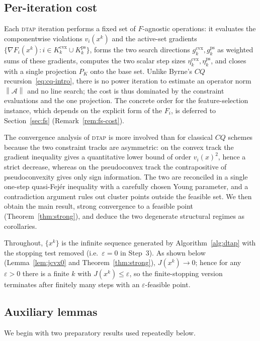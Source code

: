 \documentclass[]{interact}
\theoremstyle{plain}
\theoremstyle{definition}
\theoremstyle{remark}
\newcommand{\norm}[1]{\left\lVert #1 \right\rVert}
\newcommand{\cvx}{\mathrm{cvx}}
\newcommand{\ps}{\mathrm{ps}}
\newcommand{\dtap}{\textsc{dtap}}
\begin{document}
\subsection{Per-iteration cost}\label{ssec:complexity}
Each \dtap{} iteration performs a fixed set of $F$-agnostic operations: it evaluates the
componentwise violations $v_i(x^k)$ and the active-set gradients $\{\nabla F_i(x^k):i\in
K^{\cvx}_k\cup K^{\ps}_k\}$, forms the two search directions $g^{\cvx}_k,g^{\ps}_k$ as weighted
sums of these gradients, computes the two scalar step sizes $\eta^{\cvx}_k,\eta^{\ps}_k$, and
closes with a single projection $P_K$ onto the base set. Unlike Byrne's $CQ$
recursion~\eqref{eq:cq-intro}, there is no power iteration to estimate an operator norm
$\norm{\mathcal{A}}$ and no line search; the cost is thus dominated by the constraint
evaluations and the one projection. The concrete order for the feature-selection instance,
which depends on the explicit form of the $F_i$, is deferred to Section~\ref{sec:fs}
(Remark~\ref{rem:fs-cost}).

The convergence analysis of \dtap{} is more involved than
for classical $CQ$ schemes because the two constraint tracks are asymmetric: on the
convex track the gradient inequality gives a quantitative lower bound of order
$v_i(x)^2$, hence a strict decrease, whereas on the pseudoconvex track the
contrapositive of pseudoconvexity gives only sign information. The two are reconciled in
a single one-step quasi-Fej\'er inequality with a carefully chosen Young parameter, and a
contradiction argument rules out cluster points outside the feasible set. We then obtain
the main result, strong convergence to a feasible point (Theorem~\ref{thm:strong}), and
deduce the two degenerate structural regimes as corollaries.

Throughout, $\{x^k\}$ is the infinite sequence generated by Algorithm~\ref{alg:dtap} with
the stopping test removed (i.e.\ $\varepsilon=0$ in Step~3). As shown below
(Lemma~\ref{lem:jcvx0} and Theorem~\ref{thm:strong}), $J(x^k)\to 0$; hence for any
$\varepsilon>0$ there is a finite $k$ with $J(x^k)\le\varepsilon$, so the finite-stopping
version terminates after finitely many steps with an $\varepsilon$-feasible point.

\subsection{Auxiliary lemmas}\label{ssec:aux}
We begin with two preparatory results used repeatedly below.
\end{document}
